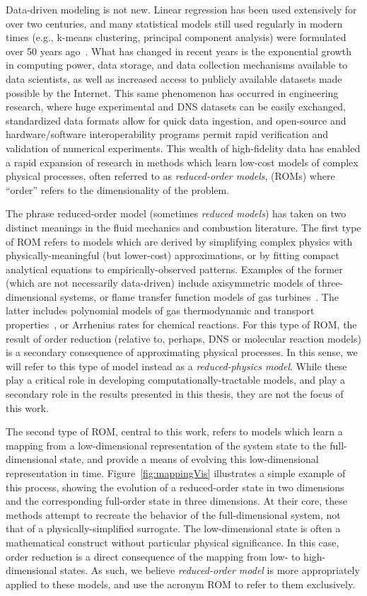 Data-driven modeling is not new. Linear regression has been used extensively for over two centuries, and many statistical models still used regularly in modern times (e.g., k-means clustering, principal component analysis) were formulated over 50 years ago~\cite{dataScience}. What has changed in recent years is the exponential growth in computing power, data storage, and data collection mechanisms available to data scientists, as well as increased access to publicly available datasets made possible by the Internet. This same phenomenon has occurred in engineering research, where huge experimental and DNS datasets can be easily exchanged, standardized data formats allow for quick data ingestion, and open-source and hardware/software interoperability programs permit rapid verification and validation of numerical experiments. This wealth of high-fidelity data has enabled a rapid expansion of research in methods which learn low-cost models of complex physical processes, often referred to as \textit{reduced-order models}, (ROMs) where ``order'' refers to the dimensionality of the problem.

The phrase reduced-order model (sometimes \textit{reduced models}) has taken on two distinct meanings in the fluid mechanics and combustion literature. The first type of ROM refers to models which are derived by simplifying complex physics with physically-meaningful (but lower-cost) approximations, or by fitting compact analytical equations to empirically-observed patterns. Examples of the former (which are not necessarily data-driven) include axisymmetric models of three-dimensional systems, or flame transfer function models of gas turbines~\cite{Schuller2002}. The latter includes polynomial models of gas thermodynamic and transport properties~\cite{McBride1993}, or Arrhenius rates for chemical reactions. For this type of ROM, the result of order reduction (relative to, perhaps, DNS or molecular reaction models) is a secondary consequence of approximating physical processes. In this sense, we will refer to this type of model instead as a \textit{reduced-physics model}. While these play a critical role in developing computationally-tractable models, and play a secondary role in the results presented in this thesis, they are not the focus of this work.

The second type of ROM, central to this work, refers to models which learn a mapping from a low-dimensional representation of the system state to the full-dimensional state, and provide a means of evolving this low-dimensional representation in time. Figure~\ref{fig:mappingVis} illustrates a simple example of this process, showing the evolution of a reduced-order state in two dimensions and the corresponding full-order state in three dimensions. At their core, these methods attempt to recreate the behavior of the full-dimensional system, not that of a physically-simplified surrogate. The low-dimensional state is often a mathematical construct without particular physical significance. In this case, order reduction is a direct consequence of the mapping from low- to high-dimensional states. As such, we believe \textit{reduced-order model} is more appropriately applied to these models, and use the acronym ROM to refer to them exclusively.

